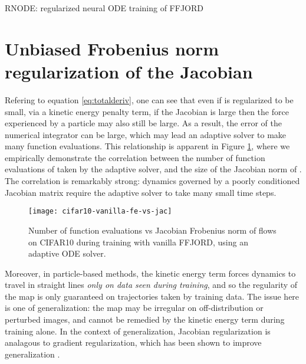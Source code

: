 \documentclass{article}
\theoremstyle{definition}
\theoremstyle{remark}
\begin{document}
\begin{algorithm}[tb]
   \caption{RNODE: regularized neural ODE training of FFJORD}
   \label{alg:rnode}
\begin{algorithmic}
  \ENDWHILE
\end{algorithmic}
\end{algorithm}
\section{Unbiased Frobenius norm regularization of the Jacobian}\label{sec:jf}

Refering to equation \eqref{eq:totalderiv}, one can see that even if  is regularized to be small, via a kinetic energy penalty term, if the Jacobian is large then the force experienced by a particle may also still be large. As a result, the error of the numerical integrator can be large, which may lead an adaptive solver to make many function evaluations. 
This relationship is apparent in Figure \ref{fig:fe-vs-jf}, where we empirically
demonstrate the correlation between the number of function evaluations of
 taken
by the adaptive solver, and the size of the Jacobian norm of . The correlation is
remarkably strong: dynamics governed by a poorly conditioned Jacobian matrix require the adaptive solver to take many small time steps.
\begin{figure}[t]
\vskip 0.2in
\begin{center}
  \centerline{\texttt{[image: cifar10-vanilla-fe-vs-jac]}}
\caption{Number of function evaluations vs Jacobian Frobenius norm of flows on
CIFAR10 during training with vanilla FFJORD, using an adaptive ODE solver.}
\label{fig:fe-vs-jf}
\end{center}
\vskip -0.2in
\end{figure}

Moreover, in particle-based methods, the kinetic energy term forces dynamics to travel in straight lines \emph{only on data seen during training}, and so the regularity of the map is only guaranteed on trajectories taken by training data. The issue here is one of generalization: the map may be irregular on off-distribution or perturbed images, and cannot be remedied by the kinetic energy term during training alone. In the context of generalization, Jacobian regularization is analagous to gradient regularization, which has been shown to improve generalization \cite{lecun92,novak18}.
\end{document}

